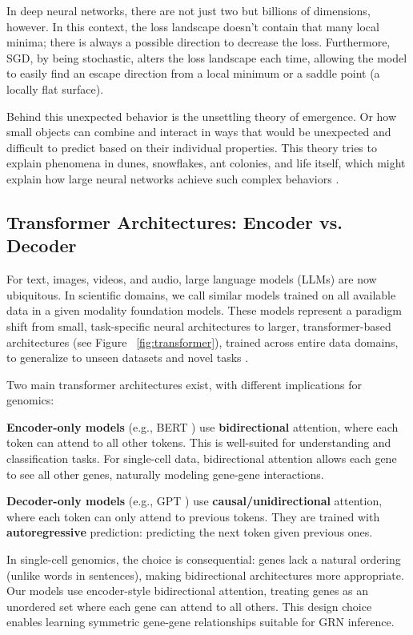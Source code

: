 In deep neural networks, there are not just two but billions of dimensions, however. In this context, the loss landscape doesn't contain that many local minima; there is always a possible direction to decrease the loss. Furthermore, \gls{SGD}, by being stochastic, alters the loss landscape each time, allowing the model to easily find an escape direction from a local minimum or a saddle point (a locally flat surface).

Behind this unexpected behavior is the unsettling theory of emergence. Or how small objects can combine and interact in ways that would be unexpected and difficult to predict based on their individual properties. This theory tries to explain phenomena in dunes, snowflakes, ant colonies, and life itself, which might explain how large neural networks achieve such complex behaviors \cite{weiEmergentAbilitiesLarge2022}.

\subsection{Transformer Architectures: Encoder vs. Decoder}
For text, images, videos, and audio, large language models (\gls{LLM}s) are now ubiquitous. In scientific domains, we call similar models trained on all available data in a given modality foundation models. These models represent a paradigm shift from small, task-specific neural architectures to larger, transformer-based architectures (see Figure ~\ref{fig:transformer}), trained across entire data domains, to generalize to unseen datasets and novel tasks \cite{bommasaniOpportunitiesRisksFoundation2022}.

Two main transformer architectures exist, with different implications for genomics:

\textbf{Encoder-only models} (e.g., BERT \cite{devlinBERTPretrainingDeep2019}) use \textbf{bidirectional} attention, where each token can attend to all other tokens. This is well-suited for understanding and classification tasks. For single-cell data, bidirectional attention allows each gene to see all other genes, naturally modeling gene-gene interactions.

\textbf{Decoder-only models} (e.g., GPT \cite{brownLanguageModelsAre2020}) use \textbf{causal/unidirectional} attention, where each token can only attend to previous tokens. They are trained with \textbf{autoregressive} prediction: predicting the next token given previous ones.

In single-cell genomics, the choice is consequential: genes lack a natural ordering (unlike words in sentences), making bidirectional architectures more appropriate. Our models use encoder-style bidirectional attention, treating genes as an unordered set where each gene can attend to all others. This design choice enables learning symmetric gene-gene relationships suitable for GRN inference.


